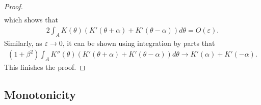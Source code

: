 \documentclass[10pt]{article}
\theoremstyle{definition}
\theoremstyle{remark}
\numberwithin{equation}{section}
\newcommand{\0}{\emptyset}
\newcommand{\alp}{\alpha}
\newcommand{\bt}{\beta}
\newcommand{\tht}{\theta}
\begin{document}
\begin{proof}
\begin{equation*}
\begin{split}
			\end{split}
		\end{equation*} which shows that \begin{equation*}
			\begin{split}
				2\int_A K(\tht) (K'(\tht+\alp)+K'(\tht-\alp)) d\tht  = O(\varepsilon). 
			\end{split}
		\end{equation*} Similarly, as $\varepsilon\to0$, it can be shown using integration by parts that \begin{equation*}
			\begin{split}
				(1+\bt^2)\int_{A} K''(\tht)(K'(\tht+\alp)+K'(\tht-\alp)) d\tht \rightarrow K'(\alp) + K'(-\alp). 
			\end{split}
		\end{equation*} This finishes the proof. 
	\end{proof}
	
	\subsection{Monotonicity}
	
\end{document}
